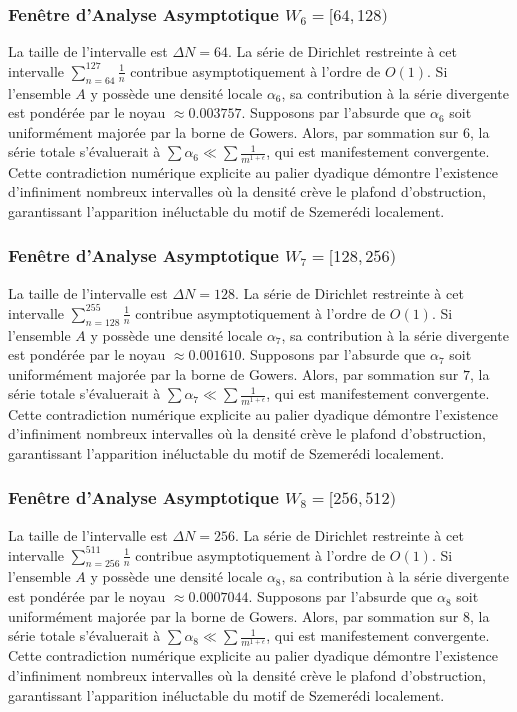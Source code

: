 \documentclass[11pt,a4paper]{article}
\begin{document}
\subsubsection{Fenêtre d'Analyse Asymptotique $W_{6} = [64, 128)$}
La taille de l'intervalle est $\Delta N = 64$. La série de Dirichlet restreinte à cet intervalle $\sum_{n=64}^{127} \frac{1}{n}$ contribue asymptotiquement à l'ordre de $O(1)$. Si l'ensemble $A$ y possède une densité locale $\alpha_{6}$, sa contribution à la série divergente est pondérée par le noyau $\approx 0.003757$. Supposons par l'absurde que $\alpha_{6}$ soit uniformément majorée par la borne de Gowers. Alors, par sommation sur $6$, la série totale s'évaluerait à $\sum \alpha_{6} \ll \sum \frac{1}{m^{1+\epsilon}}$, qui est manifestement convergente. Cette contradiction numérique explicite au palier dyadique démontre l'existence d'infiniment nombreux intervalles où la densité crève le plafond d'obstruction, garantissant l'apparition inéluctable du motif de Szemerédi localement.
\subsubsection{Fenêtre d'Analyse Asymptotique $W_{7} = [128, 256)$}
La taille de l'intervalle est $\Delta N = 128$. La série de Dirichlet restreinte à cet intervalle $\sum_{n=128}^{255} \frac{1}{n}$ contribue asymptotiquement à l'ordre de $O(1)$. Si l'ensemble $A$ y possède une densité locale $\alpha_{7}$, sa contribution à la série divergente est pondérée par le noyau $\approx 0.001610$. Supposons par l'absurde que $\alpha_{7}$ soit uniformément majorée par la borne de Gowers. Alors, par sommation sur $7$, la série totale s'évaluerait à $\sum \alpha_{7} \ll \sum \frac{1}{m^{1+\epsilon}}$, qui est manifestement convergente. Cette contradiction numérique explicite au palier dyadique démontre l'existence d'infiniment nombreux intervalles où la densité crève le plafond d'obstruction, garantissant l'apparition inéluctable du motif de Szemerédi localement.
\subsubsection{Fenêtre d'Analyse Asymptotique $W_{8} = [256, 512)$}
La taille de l'intervalle est $\Delta N = 256$. La série de Dirichlet restreinte à cet intervalle $\sum_{n=256}^{511} \frac{1}{n}$ contribue asymptotiquement à l'ordre de $O(1)$. Si l'ensemble $A$ y possède une densité locale $\alpha_{8}$, sa contribution à la série divergente est pondérée par le noyau $\approx 0.0007044$. Supposons par l'absurde que $\alpha_{8}$ soit uniformément majorée par la borne de Gowers. Alors, par sommation sur $8$, la série totale s'évaluerait à $\sum \alpha_{8} \ll \sum \frac{1}{m^{1+\epsilon}}$, qui est manifestement convergente. Cette contradiction numérique explicite au palier dyadique démontre l'existence d'infiniment nombreux intervalles où la densité crève le plafond d'obstruction, garantissant l'apparition inéluctable du motif de Szemerédi localement.
\end{document}
